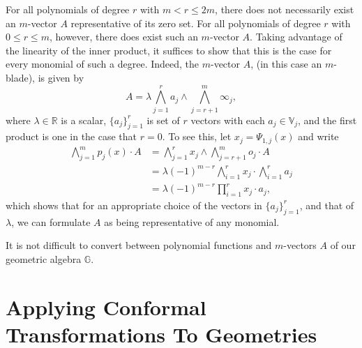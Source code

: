 \documentclass{ecgd-l}
\theoremstyle{definition}
\theoremstyle{remark}
\numberwithin{equation}{section}
\newcommand{\G}{\mathbb{G}}
\newcommand{\V}{\mathbb{V}}
\newcommand{\R}{\mathbb{R}}
\newcommand{\nvai}{\infty}
\newcommand{\nvao}{o}
\begin{document}
For all polynomials of degree $r$ with $m<r\leq 2m$, there does not necessarily exist an $m$-vector
$A$ representative of its zero set.  For all polynomials of degree $r$ with $0\leq r\leq m$, however,
there does exist such an $m$-vector $A$.  Taking advantage of the linearity of the inner product,
it suffices to show that this is the case for every monomial of such a degree.  Indeed, the $m$-vector
$A$, (in this case an $m$-blade), is given by
\begin{equation*}
A = \lambda\bigwedge_{j=1}^r a_j\wedge\bigwedge_{j=r+1}^m\nvai_j,
\end{equation*}
where $\lambda\in\R$ is a scalar, $\{a_j\}_{j=1}^r$ is set of $r$ vectors with
each $a_j\in\V_j$,
and the first product is one in the case that $r=0$.
To see this, let $x_j=\Psi_{1,j}(x)$ and write
\begin{align*}
\bigwedge_{j=1}^m p_j(x)\cdot A &= \bigwedge_{j=1}^r x_j\wedge\bigwedge_{j=r+1}^m\nvao_j\cdot A \\
 &= \lambda(-1)^{m-r}\bigwedge_{i=1}^r x_j \cdot\bigwedge_{i=1}^r a_j \\
 &= \lambda(-1)^{m-r}\prod_{i=1}^r x_j\cdot a_j,
\end{align*}
which shows that for an appropriate choice of the vectors in $\{a_j\}_{j=1}^r$,
and that of $\lambda$, we can formulate $A$ as being representative of any monomial.

It is not difficult to convert between polynomial functions and $m$-vectors $A$
of our geometric algebra $\G$.

\section{Applying Conformal Transformations To Geometries}
\end{document}
